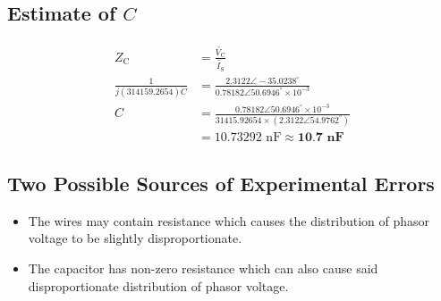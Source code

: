 \documentclass[a4paper,12pt,oneside, tikz]{book}
\begin{document}
\subsection{Estimate of $C$}
\begin{tcolorbox}
    \begin{align*}
        Z_\text{C} &= \frac{\tilde{V_\text{C}}}{\tilde{I_\text{S}}} \\
        \frac{1}{j(314159.2654)C} &= \frac{2.3122\angle -35.0238^\circ{}}{0.78182 \angle 50.6946^\circ{} \times 10^{-3}} \\
        C &= \frac{0.78182 \angle 50.6946^\circ{} \times 10^{-3}}{31415.92654\times(2.3122\angle 54.9762^\circ{})} \\
        &= 10.73292\text{ nF} \approx \textbf{10.7 nF}
    \end{align*}
\end{tcolorbox}

\subsection{Two Possible Sources of Experimental Errors}
\begin{tcolorbox}
\begin{itemize}
    \item The wires may contain resistance which causes the distribution of phasor voltage to be slightly disproportionate.
    \item The capacitor has non-zero resistance which can also cause said disproportionate distribution of phasor voltage.
\end{itemize}
\end{tcolorbox}
\end{document}
